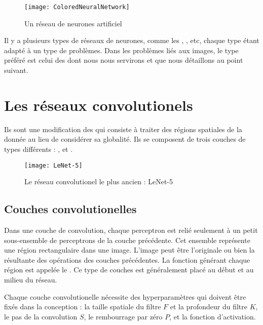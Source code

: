 \begin{figure}[H]
\begin{center}
\texttt{[image: ColoredNeuralNetwork]}
\caption{Un réseau de neurones artificiel}{\cite{commonsANN}}
\end{center}
\end{figure}

Il y a plusieurs types de réseaux de neurones, comme
les , , etc,
chaque type étant adapté à un type de problèmes.
Dans les problèmes liés aux images, le type préféré est celui des
 dont nous nous servirons et que nous détaillons
au point suivant.

\section{Les réseaux convolutionels}

Ils sont une modification des  qui consiste à
traiter des régions spatiales de la donnée au lieu de considérer sa globalité.
Ils se composent de trois couches de types différents :
,
 et
.

\begin{figure}[h]
\begin{center}
\texttt{[image: LeNet-5]}
\caption{Le réseau convolutionel le plus ancien : LeNet-5}{\cite{lecun1998gradient}}
\end{center}
\end{figure}

\subsection{Couches convolutionelles}

Dans une couche de convolution, chaque perceptron est relié seulement à un petit
sous-ensemble de perceptrons de la couche précédente. Cet ensemble représente
une région rectangulaire dans une image. L'image peut être l'originale ou
bien la résultante des opérations des couches précédentes. La fonction générant
chaque région est appelée le . Ce type de couches est généralement
placé au début et au milieu du réseau.

Chaque couche convolutionelle nécessite des hyperparamètres qui doivent
être fixés dans la conception : la taille spatiale du filtre $F$ et la
profondeur du filtre $K$, le pas de la convolution $S$, le rembourrage par zéro
$P$, et la fonction d'activation.

